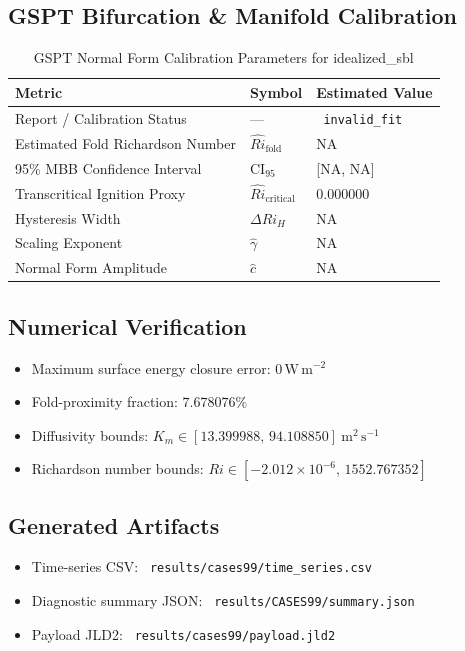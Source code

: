 \subsection{GSPT Bifurcation \& Manifold Calibration}
\begin{table}[htbp]
\centering
\caption{GSPT Normal Form Calibration Parameters for idealized\_sbl}
\label{tab:gspt_calibration_cases99_cases99_80x2m_9h_report}
\begin{tabular}{lll}
\hline
{\bfseries Metric} & {\bfseries Symbol} & {\bfseries Estimated Value} \\
\hline
Report / Calibration Status & --- & \texttt{ invalid\_fit } \\
Estimated Fold Richardson Number & $\hat{Ri}_{\mathrm{fold}}$ & NA \\
95\% MBB Confidence Interval & CI$_{95}$ & [NA, NA] \\
Transcritical Ignition Proxy & $\hat{Ri}_{\mathrm{critical}}$ & 0.000000 \\
Hysteresis Width & $\Delta Ri_H$ & NA \\
Scaling Exponent & $\hat{\gamma}$ & NA \\
Normal Form Amplitude & $\hat{c}$ & NA \\
\hline
\end{tabular}
\end{table}

\subsection{Numerical Verification}
\begin{itemize}
  \item Maximum surface energy closure error:
  $0\,\mathrm{W\,m^{-2}}$
  \item Fold-proximity fraction:
  $7.678076\%$
  \item Diffusivity bounds:
  $K_m \in [13.399988,\,94.108850]~\mathrm{m^2\,s^{-1}}$
  \item Richardson number bounds:
  $Ri \in [-2.012 \times 10^{-6},\,1552.767352]$
\end{itemize}

\subsection{Generated Artifacts}
\begin{itemize}
  \item Time-series CSV: \texttt{ results/cases99/time\_series.csv }
  \item Diagnostic summary JSON: \texttt{ results/CASES99/summary.json }
  \item Payload JLD2: \texttt{ results/cases99/payload.jld2 }
\end{itemize}

